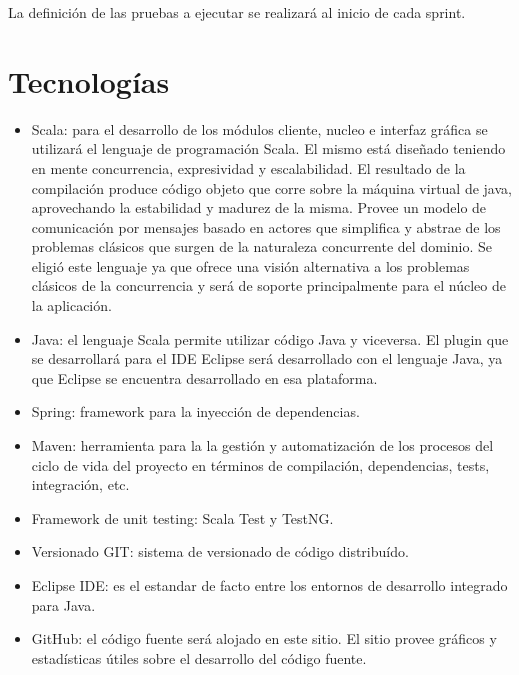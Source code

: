 \documentclass[12pt,a4paper]{article}
\begin{document}
La definición de las pruebas a ejecutar se realizará al inicio de cada sprint.	
	
	\section{Tecnologías}
	
	\begin{itemize}
	
	\item Scala: para el desarrollo de los módulos cliente, nucleo e interfaz gráfica se utilizará el lenguaje de programación Scala. El mismo está diseñado teniendo en mente concurrencia, expresividad y escalabilidad. El resultado de la compilación produce código objeto que corre sobre la máquina virtual de java, aprovechando la estabilidad y madurez de la misma. Provee un modelo de comunicación por mensajes basado en actores que simplifica y abstrae de los problemas clásicos que surgen de la naturaleza concurrente del dominio.
Se eligió este lenguaje ya que ofrece una visión alternativa a los problemas clásicos de la concurrencia y será de soporte principalmente para el núcleo de la aplicación.

	\item Java: el lenguaje Scala permite utilizar código Java y viceversa. El plugin que se desarrollará para el IDE Eclipse será desarrollado con el lenguaje Java, ya que Eclipse se encuentra desarrollado en esa plataforma.

	\item Spring: framework para la inyección de dependencias.

	\item Maven: herramienta para la la gestión y automatización de los procesos del ciclo de vida del proyecto en términos de compilación, dependencias, tests, integración, etc.

	\item Framework de unit testing: Scala Test y TestNG.

	\item Versionado GIT: sistema de versionado de código distribuído.

	\item Eclipse IDE: es el estandar de facto entre los entornos de desarrollo integrado para Java.

	\item GitHub: el código fuente será alojado en este sitio. El sitio provee gráficos y estadísticas útiles sobre el desarrollo del código fuente.	

	\end{itemize}
\end{document}
